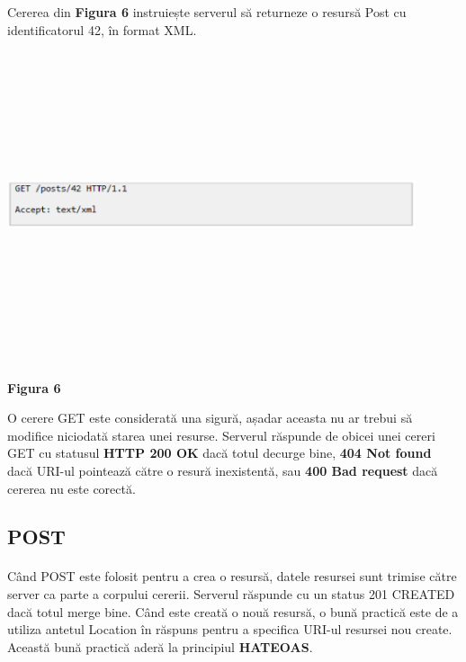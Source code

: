 \vspace{1cm}\newpage

Cererea din \textbf{Figura 6} instruiește serverul să returneze o resursă Post cu identificatorul 42, în format XML.

\begin{center}
\includegraphics[width=12cm,height=9cm,keepaspectratio]{imagini/Get2.eps} %
\paragraph{}
\textbf{Figura 6}
\end{center}

\vspace{1cm}

O cerere GET este considerată una sigură, așadar aceasta nu ar trebui să modifice niciodată starea unei resurse.
Serverul răspunde de obicei unei cereri GET cu statusul \textbf{HTTP 200 OK} dacă totul decurge bine, \textbf{404 Not found} dacă URI-ul  pointează către o resură inexistentă, sau \textbf{400 Bad request} dacă cererea nu este corectă.\cite{19}

\subsection{POST}
\paragraph{} Când POST este folosit pentru a crea o resursă, datele resursei sunt trimise către server ca parte a corpului cererii. Serverul răspunde cu un status 201 CREATED dacă totul merge bine. Când este creată o nouă resursă, o bună practică este de a utiliza antetul Location în răspuns pentru a specifica URI-ul resursei nou create. Această bună practică aderă la principiul \textbf{HATEOAS}.\cite{19}


